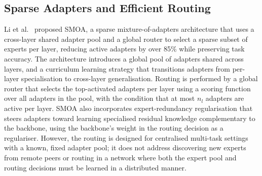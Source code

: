 \subsection{Sparse Adapters and Efficient Routing}
\label{sec:moe_routing:sparse}

Li et al.~\cite{LiZhouSparser2025} proposed SMOA, a sparse mixture-of-adapters architecture that
uses a cross-layer shared adapter pool and a global router to select a sparse subset of
experts per layer, reducing active adapters by over 85\% while preserving task accuracy.
The architecture introduces a global pool of adapters shared across layers, and a
curriculum learning strategy that transitions adapters from per-layer specialisation to
cross-layer generalisation. Routing is performed by a global router that selects the
top-activated adapters per layer using a scoring function over all adapters in the
pool, with the condition that at most $n_l$ adapters are active per layer. SMOA also
incorporates expert-redundancy regularisation that steers adapters toward learning
specialised residual knowledge complementary to the backbone, using the backbone's
weight in the routing decision as a regulariser. However, the routing is designed for
centralised multi-task settings with a known, fixed adapter pool; it does not address
discovering new experts from remote peers or routing in a network where both the expert
pool and routing decisions must be learned in a distributed manner.


